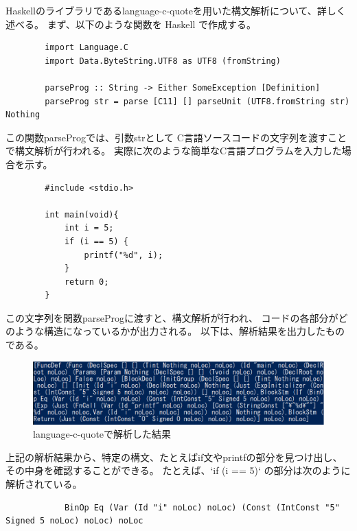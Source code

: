 \documentclass{cssspaper}
\begin{document}
        Haskellのライブラリであるlanguage-c-quoteを用いた構文解析について、詳しく述べる。
        まず、以下のような関数を Haskell で作成する。

        \begin{lstlisting}
        import Language.C
        import Data.ByteString.UTF8 as UTF8 (fromString)

        parseProg :: String -> Either SomeException [Definition]
        parseProg str = parse [C11] [] parseUnit (UTF8.fromString str) Nothing
        \end{lstlisting}

        この関数parseProgでは、引数strとして
        C言語ソースコードの文字列を渡すことで構文解析が行われる。
        実際に次のような簡単なC言語プログラムを入力した場合を示す。

        \begin{lstlisting}
        #include <stdio.h>
            
        int main(void){
            int i = 5;
            if (i == 5) {
                printf("%d", i);
            }
            return 0;
        }
        \end{lstlisting}

        この文字列を関数parseProgに渡すと、構文解析が行われ、
        コードの各部分がどのような構造になっているかが出力される。
        以下は、解析結果を出力したものである。

        \begin{figure}[h]
            \centering
            \includegraphics[width=13cm]{lcq1.png}
            \caption{language-c-quoteで解析した結果}
            \label{fig:lcq1}
        \end{figure}

        上記の解析結果から、特定の構文、たとえばif文やprintfの部分を見つけ出し、
        その中身を確認することができる。  
        たとえば、`if (i == 5)` の部分は次のように解析されている。

        \begin{lstlisting}
            BinOp Eq (Var (Id "i" noLoc) noLoc) (Const (IntConst "5" Signed 5 noLoc) noLoc) noLoc
        \end{lstlisting}
\end{document}
